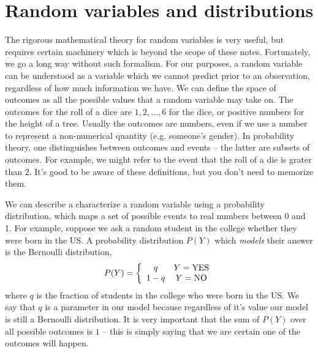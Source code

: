 

\section{Random variables and distributions}

The rigorous mathematical theory for random variables is very useful, but requires certain machinery which is beyond the scope of these notes. Fortunately, we go a long way without such formalism. For our purposes, a random variable can be understood as a variable which we cannot predict prior to an observation, regardless of how much information we have.
We can define the space of  {\dfn outcomes} as all the possible values that a random variable may take on. The outcomes for the roll of a dice are $1,2,\dots,6$ for the dice, or positive numbers for the height of a tree.  Usually the outcomes are numbers, even if we use a number to represent a non-numerical quantity (e.g. someone's gender). In probability theory, one distinguishes between outcomes and {\dfn events} -- the latter are subsets of outcomes. For example, we might refer to the event that the roll of a die is grater than $2$. It's good to be aware of these definitions, but you don't need to memorize them.



We can describe a characterize a random variable using  a {\dfn probability distribution}, which maps a set of possible events to real numbers between 0 and 1.  For example, suppose we ask a random student in the college whether they were born in the US. A probability distribution $P(Y)$ which \emph{models} their answer is the {\dfn Bernoulli distribution},
\begin{equation}
P(Y) = \left\{ \begin{array}{cc}
q & Y={\rm YES}\\
1-q & Y={\rm NO}
\end{array}
 \right.
\end{equation}
where $q$ is the fraction of students in the college who were born in the US. We say that $q$ is a {\dfn parameter} in our model because regardless of it's value our model is still a Bernoulli distribution.
 It is very important that the sum of $P(Y)$ over all possible outcomes is $1$ -- this is simply saying that we are certain one of the outcomes will happen.

